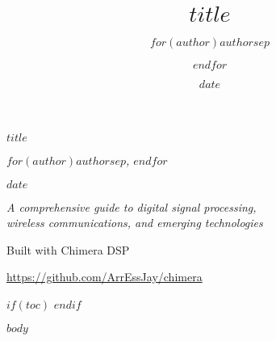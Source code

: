 \documentclass[$if(fontsize)$$fontsize$,$endif$$if(lang)$$babel-lang$,$endif$$if(papersize)$$papersize$paper,$endif$$for(classoption)$$classoption$$sep$,$endfor$]{$documentclass$}
\title{$title$}
\author{$for(author)$$author$$sep$ \and $endfor$}
\date{$date$}
\begin{document}
\begin{titlepage}
    \centering
    \vspace*{2cm}
    
    {\Huge\bfseries\color{NavyBlue} $title$\par}
    \vspace{1cm}
    {\Large\itshape $for(author)$$author$$sep$, $endfor$\par}
    \vspace{0.5cm}
    {\large $date$\par}
    
    \vspace{2cm}
    
    {\large\itshape
    A comprehensive guide to digital signal processing,\\
    wireless communications, and emerging technologies\par}
    
    \vfill
    
    {\large Built with Chimera DSP\par}
    {\small\url{https://github.com/ArrEssJay/chimera}\par}
    
    \vspace{1cm}
\end{titlepage}

$if(toc)$
{
\hypersetup{linkcolor=black}
\setcounter{tocdepth}{$toc-depth$}
\tableofcontents
\clearpage
}
$endif$

$body$
\end{document}
